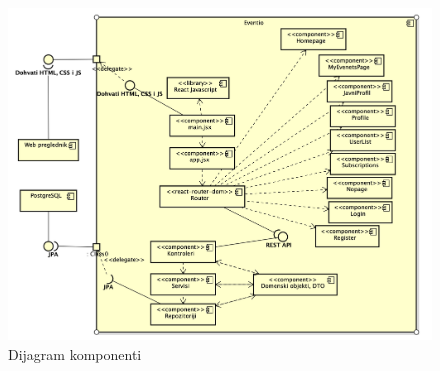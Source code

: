 		\begin{figure}[H]
			\includegraphics[scale=0.48]{dijagrami/DijagramKomponenti.png}
			\centering
			\caption{Dijagram komponenti}
			\label{fig:promjene}
		\end{figure}